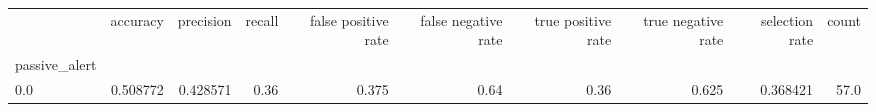\begin{tabular}{lrrrrrrrrr}
\toprule
{} &  accuracy &  precision &  recall &  false positive rate &  false negative rate &  true positive rate &  true negative rate &  selection rate &  count \\
passive\_alert &           &            &         &                      &                      &                     &                     &                 &        \\
\midrule
0.0           &  0.508772 &   0.428571 &    0.36 &                0.375 &                 0.64 &                0.36 &               0.625 &        0.368421 &   57.0 \\
\bottomrule
\end{tabular}
